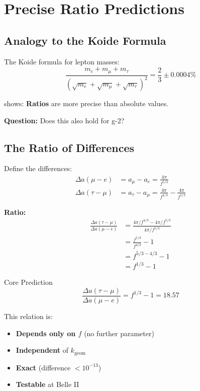 	\section{Precise Ratio Predictions}
	
	\subsection{Analogy to the Koide Formula}
	
	The Koide formula for lepton masses:
	\begin{equation}
		\frac{m_e + m_\mu + m_\tau}{(\sqrt{m_e} + \sqrt{m_\mu} + \sqrt{m_\tau})^2} = \frac{2}{3} \pm 0.0004\%
	\end{equation}
	
	shows: \textbf{Ratios} are more precise than absolute values.
	
	\textbf{Question:} Does this also hold for g-2?
	
	\subsection{The Ratio of Differences}
	
	Define the differences:
	\begin{align}
		\Delta a(\mu - e) &= a_\mu - a_e = \frac{4\pi}{f^{5/3}} \\
		\Delta a(\tau - \mu) &= a_\tau - a_\mu = \frac{4\pi}{f^{4/3}} - \frac{4\pi}{f^{5/3}}
	\end{align}
	
	\textbf{Ratio:}
	\begin{align}
		\frac{\Delta a(\tau - \mu)}{\Delta a(\mu - e)} &= \frac{4\pi/f^{4/3} - 4\pi/f^{5/3}}{4\pi/f^{5/3}} \\
		&= \frac{f^{5/3}}{f^{4/3}} - 1 \\
		&= f^{5/3 - 4/3} - 1 \\
		&= f^{1/3} - 1
		\label{eq:ratio}
	\end{align}
	
	\begin{important}{Core Prediction}
		\begin{equation}
			\boxed{\frac{\Delta a(\tau - \mu)}{\Delta a(\mu - e)} = f^{1/3} - 1 = 18.57}
		\end{equation}
		
		This relation is:
		\begin{itemize}
			\item \textbf{Depends only on $f$} (no further parameter)
			\item \textbf{Independent} of $k_{\text{geom}}$
			\item \textbf{Exact} (difference $< 10^{-13}$)
			\item \textbf{Testable} at Belle II
		\end{itemize}
	\end{important}
	
